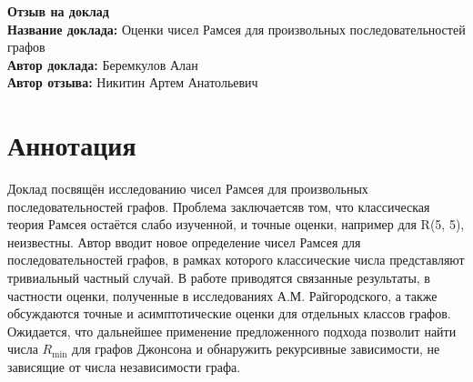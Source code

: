 \documentclass[11pt]{article}
\begin{document}
\begin{center}
    {\Large \textbf{Отзыв на доклад}}\\[1em]
    {\large \textbf{Название доклада:} Оценки чисел Рамсея для произвольных последовательностей графов}\\[0.5em]
    {\large \textbf{Автор доклада:} Беремкулов Алан}\\[0.5em]
    {\large \textbf{Автор отзыва:} Никитин Артем Анатольевич}\\[2em]
\end{center}

\section*{Аннотация}
Доклад посвящён исследованию чисел Рамсея для произвольных последовательностей графов. Проблема заключаетсяв том, что
классическая теория Рамсея остаётся слабо изученной, и точные оценки, например для R(5, 5), неизвестны. Автор вводит
новое определение чисел Рамсея для последовательностей графов, в рамках которого классические числа представляют тривиальный
частный случай. В работе приводятся связанные результаты, в частности оценки, полученные в исследованиях А.М. Райгородского,
а также обсуждаются точные и асимптотические оценки для отдельных классов графов. Ожидается, что дальнейшее применение
предложенного подхода позволит найти числа $R_{\min}$ для графов Джонсона и обнаружить рекурсивные зависимости,
не зависящие от числа независимости графа.

\end{document}
